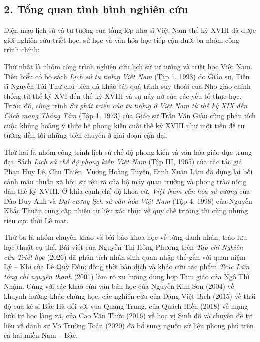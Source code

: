 \subsection*{2. Tổng quan tình hình nghiên cứu}

Diện mạo lịch sử và tư tưởng của tầng lớp nho sĩ Việt Nam thế kỷ XVIII đã được giới nghiên cứu triết học, sử học và văn hóa học tiếp cận dưới ba nhóm công trình chính:

Thứ nhất là nhóm công trình nghiên cứu lịch sử tư tưởng và triết học Việt Nam. Tiêu biểu có bộ sách \textit{Lịch sử tư tưởng Việt Nam} (Tập 1, 1993) do Giáo sư, Tiến sĩ Nguyễn Tài Thư chủ biên đã khảo sát quá trình suy thoái của Nho giáo chính thống từ thế kỷ XVI đến thế kỷ XVIII và sự nảy nở của các yếu tố thực học. Trước đó, công trình \textit{Sự phát triển của tư tưởng ở Việt Nam từ thế kỷ XIX đến Cách mạng Tháng Tám} (Tập 1, 1973) của Giáo sư Trần Văn Giàu cũng phân tích cuộc khủng hoảng ý thức hệ phong kiến cuối thế kỷ XVIII như một tiền đề tư tưởng dẫn tới những biến chuyển ở giai đoạn cận đại.

Thứ hai là nhóm công trình lịch sử chế độ phong kiến và văn hóa giáo dục trung đại. Sách \textit{Lịch sử chế độ phong kiến Việt Nam} (Tập III, 1965) của các tác giả Phan Huy Lê, Chu Thiên, Vương Hoàng Tuyên, Đinh Xuân Lâm đã dựng lại bối cảnh mâu thuẫn xã hội, sự rệu rã của bộ máy quan trường và phong trào nông dân thế kỷ XVIII. Ở khía cạnh chế độ khoa cử, \textit{Việt Nam văn hóa sử cương} của Đào Duy Anh và \textit{Đại cương lịch sử văn hóa Việt Nam} (Tập 4, 1998) của Nguyễn Khắc Thuần cung cấp nhiều tư liệu xác thực về quy chế trường thi cùng những tiêu cực thời Lê mạt.

Thứ ba là nhóm chuyên khảo và bài báo khoa học về từng danh nhân, trào lưu học thuật cụ thể. Bài viết của Nguyễn Thị Hồng Phương trên \textit{Tạp chí Nghiên cứu Triết học} (2026) đã phân tích nhân sinh quan nhập thế gắn với quan niệm Lý -- Khí của Lê Quý Đôn; đồng thời bản dịch và khảo cứu tác phẩm \textit{Trúc Lâm tông chỉ nguyên thanh} (2001) làm rõ xu hướng dung hợp Tam giáo của Ngô Thì Nhậm. Cùng với các khảo cứu văn bản học của Nguyễn Kim Sơn (2004) về khuynh hướng khảo chứng học, các nghiên cứu của Đặng Việt Bích (2015) về thái độ của kẻ sĩ Bắc Hà đối với vua Quang Trung, của Quách Hiền (2018) về mạng lưới tư học làng xã, của Cao Văn Thức (2016) về học vị Sinh đồ và chuyên đề tư liệu về danh sư Võ Trường Toản (2020) đã bổ sung nguồn sử liệu phong phú trên cả hai miền Nam -- Bắc.

